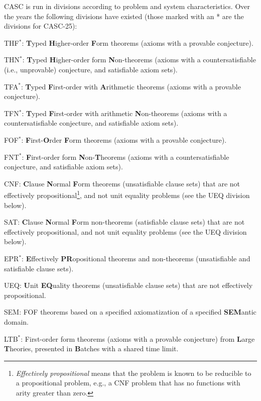 \documentclass{easychair}
\newenvironment{packed_itemize}{
\vspace*{-0.2em}
\begin{itemize}
\setlength{\partopsep}{0pt}
\setlength{\itemsep}{1pt}
\setlength{\parskip}{0pt}
\setlength{\parsep}{0pt}
}{\end{itemize}}
\begin{document}
CASC is run in divisions according to problem and system characteristics. 
Over the years the following divisions have existed (those marked with an
* are the divisions for CASC-25):
\begin{packed_itemize}
\item THF$^*$: 
      {\bf T}yped {\bf H}igher-order {\bf F}orm theorems (axioms with a 
      provable conjecture).
\item THN$^*$: 
      {\bf T}yped {\bf H}igher-order form {\bf N}on-theorems (axioms 
      with a countersatisfiable (i.e., unprovable) conjecture, and 
      satisfiable axiom sets).
\item TFA$^*$: 
      {\bf T}yped {\bf F}irst-order with {\bf A}rithmetic theorems (axioms 
      with a provable conjecture).
\item TFN$^*$: 
      {\bf T}yped {\bf F}irst-order with arithmetic {\bf N}on-theorems 
      (axioms with a countersatisfiable conjecture, and satisfiable axiom sets).
\item FOF$^*$: 
      {\bf F}irst-{\bf O}rder {\bf F}orm theorems (axioms with a provable 
      conjecture). 
\item FNT$^*$: 
      {\bf F}irst-order form {\bf N}on-{\bf T}heorems (axioms with a 
      countersatisfiable conjecture, and satisfiable axiom sets).
\item CNF:
      {\bf C}lause {\bf N}ormal {\bf F}orm theorems (unsatisfiable clause 
      sets) that are not effectively propositional\footnote{%
      {\em Effectively propositional} means that the problem is known to be 
      reducible to a propositional problem, e.g., a CNF problem that has no 
      functions with arity greater than zero.}, and not unit equality 
      problems (see the UEQ division below).
\item SAT:
      {\bf C}lause {\bf N}ormal {\bf F}orm non-theorems (satisfiable clause 
      sets) that are not effectively propositional, and not unit equality 
      problems (see the UEQ division below).
\item EPR$^*$: 
      {\bf E}ffectively {\bf PR}opositional theorems and non-theorems
      (unsatisfiable and satisfiable clause sets).
\item UEQ:
      {\bf U}nit {\bf EQ}uality theorems (unsatisfiable clause
      sets) that are not effectively propositional.
\item SEM:
      FOF theorems based on a specified axiomatization of a specified
      {\bf SEM}antic domain.
\item LTB$^*$: 
      First-order form theorems (axioms with a provable 
      conjecture) from {\bf L}arge {\bf T}heories, presented in {\bf B}atches
      with a shared time limit.
\end{packed_itemize}
\end{document}
